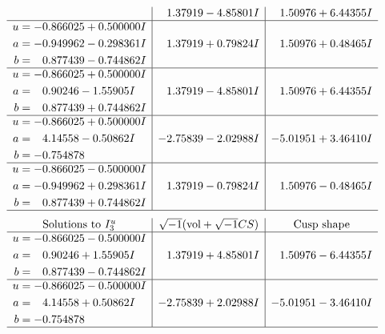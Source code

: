 \documentclass[1p]{elsarticle_modified}
\theoremstyle{definition}
\newcommand{\I}{\sqrt{-1}}
\begin{document}
$$\begin{array}{c|c|c}
 & \phantom{-}1.37919 - 4.85801 I & \phantom{-}1.50976 + 6.44355 I \\ \hline\begin{aligned}
u &= -0.866025 + 0.500000 I \\
a &= -0.949962 - 0.298361 I \\
b &= \phantom{-}0.877439 - 0.744862 I\end{aligned}
 & \phantom{-}1.37919 + 0.79824 I & \phantom{-}1.50976 + 0.48465 I \\ \hline\begin{aligned}
u &= -0.866025 + 0.500000 I \\
a &= \phantom{-}0.90246 - 1.55905 I \\
b &= \phantom{-}0.877439 + 0.744862 I\end{aligned}
 & \phantom{-}1.37919 - 4.85801 I & \phantom{-}1.50976 + 6.44355 I \\ \hline\begin{aligned}
u &= -0.866025 + 0.500000 I \\
a &= \phantom{-}4.14558 - 0.50862 I \\
b &= -0.754878\phantom{ +0.000000I}\end{aligned}
 & -2.75839 - 2.02988 I & -5.01951 + 3.46410 I \\ \hline\begin{aligned}
u &= -0.866025 - 0.500000 I \\
a &= -0.949962 + 0.298361 I \\
b &= \phantom{-}0.877439 + 0.744862 I\end{aligned}
 & \phantom{-}1.37919 - 0.79824 I & \phantom{-}1.50976 - 0.48465 I\\
 \hline 
 \end{array}$$\newpage$$\begin{array}{c|c|c}  
\text{Solutions to }I^u_{3}& \I (\text{vol} + \sqrt{-1}CS) & \text{Cusp shape}\\
 \hline 
\begin{aligned}
u &= -0.866025 - 0.500000 I \\
a &= \phantom{-}0.90246 + 1.55905 I \\
b &= \phantom{-}0.877439 - 0.744862 I\end{aligned}
 & \phantom{-}1.37919 + 4.85801 I & \phantom{-}1.50976 - 6.44355 I \\ \hline\begin{aligned}
u &= -0.866025 - 0.500000 I \\
a &= \phantom{-}4.14558 + 0.50862 I \\
b &= -0.754878\phantom{ +0.000000I}\end{aligned}
 & -2.75839 + 2.02988 I & -5.01951 - 3.46410 I\\
 \hline 
 \end{array}$$\newpage
\end{document}
